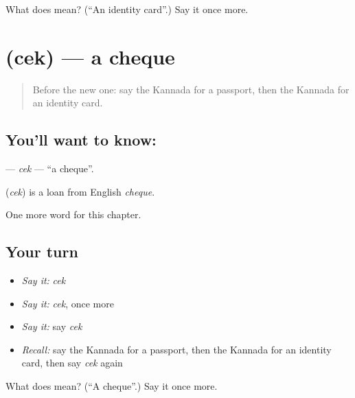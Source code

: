 \begin{tcolorbox}[breakable,colback=teal!4,colframe=teal!35!black,title={Before you move on}]
What does   mean? (\textquotedblleft{}An identity card\textquotedblright{}.) Say it once more.
\end{tcolorbox}
\section[\texorpdfstring{\kn{ಚೆಕ್} (cek)}{ಚೆಕ್ (cek)}]{ (cek) — a cheque}

\label{lesson:KA-C223-cek}



\begin{quote}
Before the new one: say the Kannada for a passport, then the Kannada for an identity card.
\end{quote}

\subsection*{You'll want to know: }
\textbf{} — \emph{cek} — \textquotedblleft{}a cheque\textquotedblright{}.

\begin{cousinweb}
\textbf{} (\emph{cek}) is a loan from English \emph{cheque}.
\end{cousinweb}

\begin{grammarlens}[title={What you've built}]
One more word for this chapter.
\end{grammarlens}

\subsection*{Your turn}
\begin{itemize}
\raggedright
  \item \emph{Say it:} \emph{cek}
  \item \emph{Say it:} \emph{cek}, once more
  \item \emph{Say it:} say \emph{cek}
  \item \emph{Recall:} say the Kannada for a passport, then the Kannada for an identity card, then say \emph{cek} again
\end{itemize}

\begin{tcolorbox}[breakable,colback=teal!4,colframe=teal!35!black,title={Before you move on}]
What does  mean? (\textquotedblleft{}A cheque\textquotedblright{}.) Say it once more.
\end{tcolorbox}
